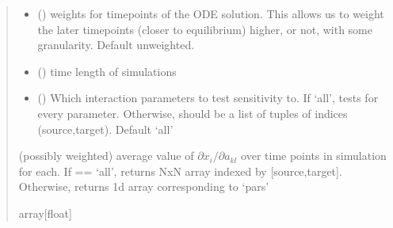 \documentclass[letterpaper,10pt,english]{sphinxmanual}
\begin{document}
\begin{fulllineitems}
\begin{quote}
\begin{description}
\begin{itemize}
\item {} 
\sphinxAtStartPar
{} (\sphinxstyleliteralemphasis{\sphinxupquote{{[}}}\sphinxstyleliteralemphasis{\sphinxupquote{{]}}}) \textendash{} weights for time\sphinxhyphen{}points of the ODE solution. This allows us to weight the later timepoints (closer to equilibrium) higher, or not, with some granularity. Default unweighted.

\item {} 
\sphinxAtStartPar
{} () \textendash{} time length of simulations

\item {} 
\sphinxAtStartPar
{} (\sphinxstyleliteralemphasis{\sphinxupquote{{[}}}\sphinxstyleliteralemphasis{\sphinxupquote{{[}}}\sphinxstyleliteralemphasis{\sphinxupquote{,}}\sphinxstyleliteralemphasis{\sphinxupquote{{]}}}\sphinxstyleliteralemphasis{\sphinxupquote{{]}}}) \textendash{} Which interaction parameters to test sensitivity to. If ‘all’, tests for every parameter. Otherwise, should be a list of tuples of indices (source,target). Default ‘all’

\end{itemize}

\sphinxAtStartPar
(possibly weighted) average value of \(\partial x_i/\partial a_{kl}\) over time points in simulation for each. If  == ‘all’, returns NxN array indexed by {[}source,target{]}. Otherwise, returns 1d array corresponding to ‘pars’

\sphinxAtStartPar
array{[}float{]}

\end{description}\end{quote}

\end{fulllineitems}

\end{document}
